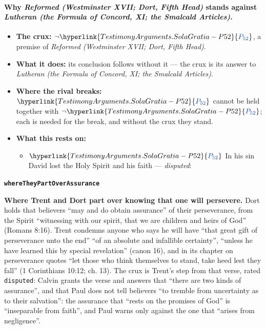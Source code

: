 \documentclass[11pt]{article}
\newcommand{\pvar}[2]{\hyperlink{#1-P#2}{\textcolor{claimlink}{P_{#2}}}}
\begin{document}
\paragraph{Why \emph{Reformed (Westminster XVII; Dort, Fifth Head)} stands against \emph{Lutheran (the Formula of Concord, XI; the Smalcald Articles)}.}
\begin{itemize}
\item \textbf{The crux:} \(\lnot \pvar{TestimonyArguments.SolaGratia}{52}\), a premise of \emph{Reformed (Westminster XVII; Dort, Fifth Head)}.
\item \textbf{What it does:} its conclusion follows without it --- the crux is its answer to \emph{Lutheran (the Formula of Concord, XI; the Smalcald Articles)}.
\item \textbf{Where the rival breaks:} \(\pvar{TestimonyArguments.SolaGratia}{52}\) cannot be held together with \(\lnot \pvar{TestimonyArguments.SolaGratia}{52}\); each is needed for the break, and without the crux they stand.
\item \textbf{What this rests on:}
\begin{itemize}
\item \(\pvar{TestimonyArguments.SolaGratia}{52}\) In his sin David lost the Holy Spirit and his faith --- \emph{disputed}: \cite[299--300]{calvin-psalms-2-1846}
\end{itemize}
\end{itemize}
\par\medskip\noindent\textbf{\texttt{where\allowbreak{}They\allowbreak{}Part\allowbreak{}Over\allowbreak{}Assurance}}\par\nobreak\noindent
\textbf{Where Trent and Dort part over knowing that one will persevere.} Dort holds that believers “may and do obtain assurance” of their perseverance, from the Spirit “witnessing with our spirit, that we are children and heirs of God” (Romans 8:16). Trent condemns anyone who says he will have “that great gift of perseverance unto the end” “of an absolute and infallible certainty”, “unless he have learned this by special revelation” (canon 16), and in its chapter on perseverance quotes “let those who think themselves to stand, take heed lest they fall” (1 Corinthians 10:12; ch. 13). The crux is Trent’s step from that verse, rated \texttt{disputed}: Calvin grants the verse and answers that “there are two kinds of assurance”, and that Paul does not tell believers “to tremble from uncertainty as to their salvation”: the assurance that “rests on the promises of God” is “inseparable from faith”, and Paul warns only against the one that “arises from negligence”.
\end{document}
